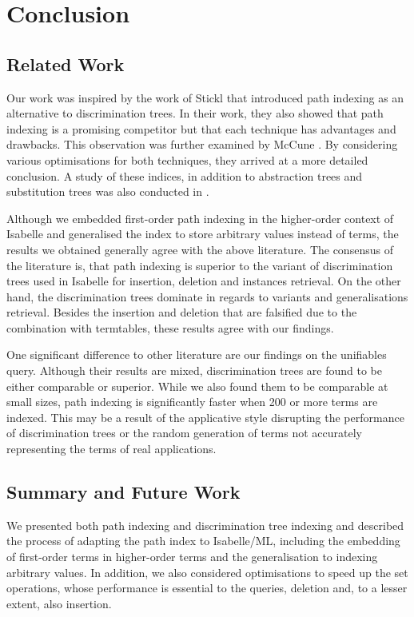 \chapter{Conclusion}
\section{Related Work}
Our work was inspired by the work of Stickl \cite{noauthor_path-indexing_nodate} that introduced path indexing as an alternative to discrimination trees. In their work, they also showed that path indexing is a promising competitor but that each technique has advantages and drawbacks. This observation was further examined by McCune \cite{mccune_experiments_1992}. By considering various optimisations for both techniques, they arrived at a more detailed conclusion. A study of these indices, in addition to abstraction trees and substitution trees was also conducted in \cite{carbonell_comparison_1995}.

Although we embedded first-order path indexing in the higher-order context of Isabelle and generalised the index to store arbitrary values instead of terms, the results we obtained generally agree with the above literature. The consensus of the literature is, that path indexing is superior to the variant of discrimination trees used in Isabelle for insertion, deletion and instances retrieval. On the other hand, the discrimination trees dominate in regards to variants and generalisations retrieval. Besides the insertion and deletion that are falsified due to the combination with termtables, these results agree with our findings.

One significant difference to other literature are our findings on the unifiables query. Although their results are mixed, discrimination trees are found to be either comparable or superior. While we also found them to be comparable at small sizes, path indexing is significantly faster when 200 or more terms are indexed. This may be a result of the applicative style disrupting the performance of discrimination trees or the random generation of terms not accurately representing the terms of real applications.

\section{Summary and Future Work}
We presented both path indexing and discrimination tree indexing and described the process of adapting the path index to Isabelle/ML, including the embedding of first-order terms in higher-order terms and the generalisation to indexing arbitrary values. In addition, we also considered optimisations to speed up the set operations, whose performance is essential to the queries, deletion and, to a lesser extent, also insertion.

